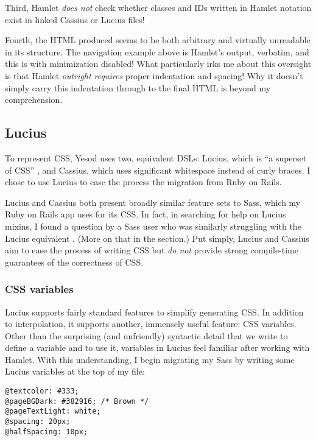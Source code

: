 Third, Hamlet \emph{does not} check whether classes and IDs written in Hamlet notation exist in linked Cassius or Lucius files!

Fourth, the HTML produced seems to be both arbitrary and virtually unreadable in its structure. The navigation example above is Hamlet's output, verbatim, and this is with minimization disabled! What particularly irks me about this oversight is that Hamlet \emph{outright requires} proper indentation and spacing! Why it doesn't simply carry this indentation through to the final HTML is beyond my comprehension.

\subsection{Lucius}
To represent CSS, Yesod uses two, equivalent DSLs: Lucius, which is ``a superset of CSS'' \cite{ybkShakes}, and Cassius, which uses significant whitespace instead of curly braces. I chose to use Lucius to ease the process the migration from Ruby on Rails.

Lucius and Cassius both present broadly similar feature sets to Sass, which my Ruby on Rails app uses for its CSS. In fact, in searching for help on Lucius mixins, I found a question by a Sass user who was similarly struggling with the Lucius equivalent \cite{soSass}. (More on that in the  section.) Put simply, Lucius and Cassius aim to ease the process of writing CSS but \emph{do not} provide strong compile-time guarantees of the correctness of CSS.

\subsubsection{CSS variables}

Lucius supports fairly standard features to simplify generating CSS. In addition to interpolation, it supports another, immensely useful feature: CSS variables. Other than the surprising (and unfriendly) syntactic detail that we write  to define a variable and  to use it, variables in Lucius feel familiar after working with Hamlet. With this understanding, I begin migrating my Sass by writing some Lucius variables at the top of my  file:

\begin{Verbatim}
@textcolor: #333;
@pageBGDark: #382916; /* Brown */
@pageTextLight: white;
@spacing: 20px;
@halfSpacing: 10px;
\end{Verbatim}

